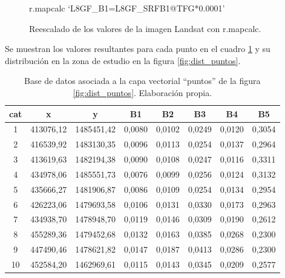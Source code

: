 \begin{figure}[ht]
	\centering
	\begin{boxedverbatim}
	r.mapcalc `L8GF_B1=L8GF_SRFB1@TFG*0.0001'
	\end{boxedverbatim}
	\caption[Reescalado de valores]{Reescalado de los valores de la imagen Landsat con r.mapcalc.}
\end{figure}

Se muestran los valores resultantes para cada punto en el cuadro \ref{tab:tabla_puntos} y su distribución en la zona de estudio en la figura \ref{fig:dist_puntos}.%

\begin{table}[ht]
	\centering
	\begin{tabular}{@{}cccccccc@{}}
	\toprule[0.4mm]
	cat & x & y & B1 & B2 & B3 & B4 & B5\\
	\midrule
	1 & 413076,12 & 1485451,42 & 0,0080 & 0,0102 & 0,0249 & 0,0120 & 0,3054\\
	2 & 416539,92 & 1483130,35 & 0,0096 & 0,0113 & 0,0254 & 0,0137 & 0,2964\\
	3 & 413619,63 & 1482194,38 & 0,0090 & 0,0108 & 0,0247 & 0,0116 & 0,3311\\
	4 & 434978,06 & 1485551,73 & 0,0076 & 0,0099 & 0,0256 & 0,0124 & 0,3132\\
	5 & 435666,27 & 1481906,87 & 0,0086 & 0,0109 & 0,0254 & 0,0134 & 0,2954\\
	6 & 426223,06 & 1479693,58 & 0,0106 & 0,0131 & 0,0330 & 0,0173 & 0,2963\\
	7 & 434938,70 & 1478948,70 & 0,0119 & 0,0146 & 0,0309 & 0,0190 & 0,2612\\
	8 & 455289,36 & 1479452,68 & 0,0132 & 0,0163 & 0,0385 & 0,0268 & 0,2300\\
	9 & 447490,46 & 1478621,82 & 0,0147 & 0,0187 & 0,0413 & 0,0286 & 0,2300\\
	10 & 452584,20 & 1462969,61 & 0,0115 & 0,0143 & 0,0345 & 0,0209 & 0,2577\\
	\bottomrule[0.4mm]
	\end{tabular}
	\caption[Base de datos de puntos de comprobación]{Base de datos asociada a la capa vectorial ``puntos'' de la figura \ref{fig:dist_puntos}. Elaboración propia.}
	\label{tab:tabla_puntos}
\end{table}

